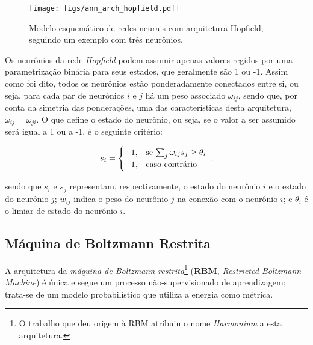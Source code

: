 \begin{figure}[H]
    \centering
    \texttt{[image: figs/ann\_arch\_hopfield.pdf]}
    \caption{Modelo esquemático de redes neurais com arquitetura Hopfield, seguindo um exemplo com três neurônios.}
    \label{fig:ann_arch_hopfield}
\end{figure}

Os neurônios da rede \textit{Hopfield} podem assumir apenas valores regidos por uma parametrização binária para seus estados, que geralmente são 1 ou -1. Assim como foi dito, todos os neurônios estão ponderadamente conectados entre si, ou seja, para cada par de neurônios $i$ e $j$ há um peso associado $\omega_{ij}$, sendo que, por conta da simetria das ponderações, uma das características desta arquitetura, $\omega_{ij} = \omega_{ji}$. O que define o estado do neurônio, ou seja, se o valor a ser assumido será igual a 1 ou a -1, é o seguinte critério:


    \begin{equation}
        s_{i} = 
        \begin{cases}
            +1, & \text{se $\sum\nolimits_{j}\omega_{ij} s_{j} \geq \theta_{i}$}\\
            -1, & \text{caso contrário}
        \end{cases}
        \hspace{0.1cm},
        \vspace{0.2cm}
        \label{eq:ann_arch_hopfield_state}
    \end{equation}

\noindent sendo que $s_{i}$ e $s_{j}$ representam, respectivamente, o estado do neurônio $i$ e o estado do neurônio $j$; $w_{ij}$ indica o peso do neurônio $j$ na conexão com o neurônio $i$; e $\theta_{i}$ é o limiar de estado do neurônio $i$.


\subsection{Máquina de Boltzmann Restrita}
\label{subsec:ann_boltzmann_machine}

A arquitetura da \textit{máquina de Boltzmann restrita}\footnote{O trabalho que deu origem à RBM atribuiu o nome \textit{Harmonium} a esta arquitetura.} (\textbf{RBM}, \textit{Restricted Boltzmann Machine}) \citep{smolensky1986information} é única e segue um processo não-supervisionado de aprendizagem; trata-se de um modelo probabilístico que utiliza a energia como métrica.

